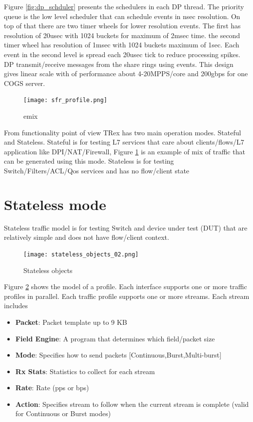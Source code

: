 \documentclass[conference]{IEEEtran}
\begin{document}
Figure \ref{fig:dp_schduler} presents the schedulers in each DP thread. The priority queue is the low level scheduler that can schedule events in nsec resolution. On top of that there are two timer wheels for lower resolution events. The first has resolution of 20usec with 1024 buckets for maximum of 2msec time. 
the second timer wheel has resolution of 1msec with 1024 buckets maximum of 1sec. Each event in the second level is spread each 20usec tick to reduce processing spikes. 
DP transmit/receive messages from the share rings using events. 
This design gives linear scale with of performance about 4-20MPPS/core and 200gbps for one COGS server. 

\begin{figure}[h]
  \texttt{[image: sfr\_profile.png]}
  \caption{emix}
  \label{fig:emix}
\end{figure}

From functionality point of view TRex has two main operation modes. Stateful and Stateless. Stateful is for testing L7 services that care about clients/flows/L7 application like DPI/NAT/Firewall, Figure \ref{fig:emix} is an example of mix of traffic that can be generated using this mode. 
Stateless is for testing Switch/Filters/ACL/Qos services and has no flow/client state

\section{Stateless mode}

Stateless traffic model is for testing Switch and device under test (DUT) that are relatively simple and does not have flow/client context. 

\begin{figure}[h]
  \texttt{[image: stateless\_objects\_02.png]}
  \caption{Stateless objects}
  \label{fig:stlobjects}
\end{figure}

Figure \ref{fig:stlobjects} shows the model of a profile. Each interface supports one or more traffic profiles in parallel.
Each traffic profile supports one or more streams. Each stream includes

\begin{itemize}
  \item \textbf{Packet}: Packet template up to 9 KB
  \item \textbf{Field Engine}: A program that determines which field/packet size
  \item \textbf{Mode}: Specifies how to send packets [Continuous,Burst,Multi-burst]
  \item \textbf{Rx Stats}: Statistics to collect for each stream
  \item \textbf{Rate}: Rate (pps or bps)
  \item \textbf{Action}: Specifies stream to follow when the current stream is complete (valid for Continuous or Burst modes)
\end{itemize}
\end{document}
